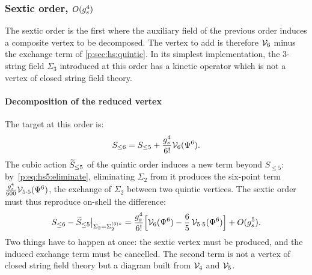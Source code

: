 \subsubsection{Sextic order, \texorpdfstring{$O(\gs^4)$}{O(gs**4)}}
\label{p:sec:hs:sextic}

The sextic order is the first where the auxiliary field of the previous order induces a composite vertex to be decomposed.
The vertex to add is therefore $\vertex{6}$ minus the exchange term of \cref{p:sec:hs:quintic}.
In its simplest implementation, the $3$-string field $\Sigma_3$ introduced at this order has a kinetic operator which is not a vertex of closed string field theory.


\paragraph{Decomposition of the reduced vertex}
\label{p:sec:hs:sextic:vertex}

The target at this order is:
\begin{equation}
  S_{\le 6}
    = S_{\le 5} + \frac{\gs^4}{6!} \vertex{6}(\Psi^6).
\end{equation}
The cubic action $\caction[\le 5]$ of the quintic order induces a new term beyond $S_{\le 5}$: by~\eqref{p:eq:hs5:eliminate}, eliminating $\Sigma_2$ from it produces the six-point term $\tfrac{\gs^4}{600} \vertex{5 \cdot 5}(\Psi^6)$, the exchange of $\Sigma_2$ between two quintic vertices.
The sextic order must thus reproduce on-shell the difference:
\begin{equation}
  \label{p:eq:hs6:remainder}
  S_{\le 6} - \caction[\le 5] \big|_{\Sigma_2 = \Sigma_2^{(3)*}}
    = \frac{\gs^4}{6!} \Big[ \vertex{6}(\Psi^6) - \frac{6}{5} \, \vertex{5 \cdot 5}(\Psi^6) \Big]
      + O(\gs^5).
\end{equation}
Two things have to happen at once: the sextic vertex must be produced, and the induced exchange term must be cancelled.
The second term is not a vertex of closed string field theory but a diagram built from $\vertex{4}$ and $\vertex{5}$.

